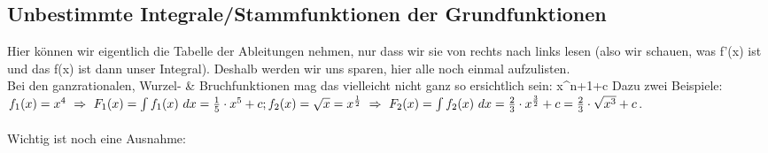 \subsection{Unbestimmte Integrale/Stammfunktionen der Grundfunktionen}
	Hier können wir eigentlich die Tabelle der Ableitungen nehmen, nur dass wir sie
	von rechts nach links lesen (also wir schauen, was f'(x) ist und das f(x) ist
	dann unser Integral). Deshalb werden wir uns sparen, hier alle noch einmal
	aufzulisten.\\
	Bei den ganzrationalen, Wurzel- \& Bruchfunktionen mag das vielleicht nicht
	ganz so ersichtlich sein:
	     x^{n+1}+c\] Dazu zwei Beispiele:\(f_1(x)=x^4\ \Rightarrow\ F_1(x)=\int f_1(x)\
	dx=\frac{1}{5}\cdot x^5+c;\\
	 f_2(x)=\sqrt{x}=x^\frac{1}{2}\ \Rightarrow\ F_2(x)=\int f_2(x)\
	 dx=\frac{2}{3}\cdot x^{\frac{3}{2}}+c=\frac{2}{3}\cdot \sqrt{x^3}+c\).\\ \\
	Wichtig ist noch eine Ausnahme:
	\formel{\[f(x)=\frac{1}{x}\ \Rightarrow\ \int f(x)\ dx=ln(x)+c\]}
